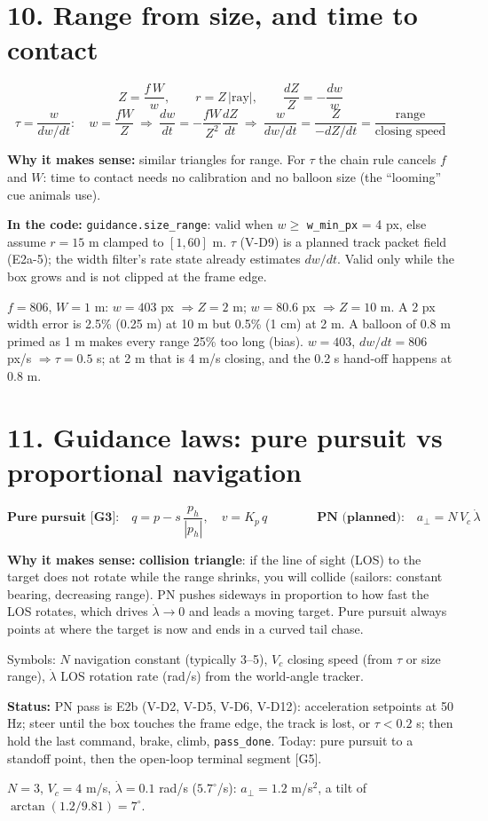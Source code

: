 \documentclass[10pt]{article}
\newcommand{\code}[1]{\textcolor{code}{\texttt{#1}}}
\newcommand{\where}[1]{\par\textbf{\textcolor{code}{In the code:}} #1}
\newcommand{\why}[1]{\par\textbf{\textcolor{idea}{Why it makes sense:}} #1}
\newcommand{\status}[1]{\par\textbf{\textcolor{warn}{Status:}} #1}
\begin{document}
\section*{10. Range from size, and time to contact}
\begin{eqbox}
\[
Z = \frac{f\,W}{w},\qquad r = Z\,|\text{ray}|,\qquad
\frac{dZ}{Z} = -\frac{dw}{w}
\]
\[
\tau = \frac{w}{dw/dt}:\quad w = \frac{fW}{Z}\ \Rightarrow\ \frac{dw}{dt} = -\frac{fW}{Z^2}\frac{dZ}{dt}
\ \Rightarrow\ \frac{w}{dw/dt} = \frac{Z}{-dZ/dt} = \frac{\text{range}}{\text{closing speed}}
\]
\end{eqbox}
\why{similar triangles for range. For $\tau$ the chain rule cancels $f$ and $W$: time to
contact needs no calibration and no balloon size (the ``looming'' cue animals use).}
\where{\code{guidance.size\_range}: valid when $w \ge$ \code{w\_min\_px} = 4 px, else
assume $r = 15$ m clamped to $[1, 60]$ m. $\tau$ (V-D9) is a planned track packet field
(E2a-5); the width filter's rate state already estimates $dw/dt$. Valid only while the box
grows and is not clipped at the frame edge.}
\begin{exbox}
$f = 806$, $W = 1$ m: $w = 403$ px $\Rightarrow Z = 2$ m; $w = 80.6$ px $\Rightarrow
Z = 10$ m. A 2 px width error is 2.5\% (0.25 m) at 10 m but 0.5\% (1 cm) at 2 m. A balloon
of 0.8 m primed as 1 m makes every range 25\% too long (bias).
$w = 403$, $dw/dt = 806$ px/s $\Rightarrow \tau = 0.5$ s; at 2 m that is 4 m/s closing,
and the 0.2 s hand-off happens at 0.8 m.
\end{exbox}

\section*{11. Guidance laws: pure pursuit vs proportional navigation}
\begin{eqbox}
\[
\textbf{Pure pursuit [G3]:}\quad q = p - s\,\frac{p_h}{|p_h|},\quad v = K_p\,q
\qquad\qquad
\textbf{PN (planned):}\quad a_\perp = N\,V_c\,\dot\lambda
\]
\end{eqbox}
\why{\textbf{collision triangle}: if the line of sight (LOS) to the target does not
rotate while the range shrinks, you will collide (sailors: constant bearing, decreasing
range). PN pushes sideways in proportion to how fast the LOS rotates, which drives
$\dot\lambda \to 0$ and leads a moving target. Pure pursuit always points at where the
target is now and ends in a curved tail chase.}

Symbols: $N$ navigation constant (typically 3--5), $V_c$ closing speed (from $\tau$ or
size range), $\dot\lambda$ LOS rotation rate (rad/s) from the world-angle tracker.
\status{PN pass is E2b (V-D2, V-D5, V-D6, V-D12): acceleration setpoints at 50 Hz; steer
until the box touches the frame edge, the track is lost, or $\tau < 0.2$ s; then hold the
last command, brake, climb, \code{pass\_done}. Today: pure pursuit to a standoff point,
then the open-loop terminal segment [G5].}
\begin{exbox}
$N = 3$, $V_c = 4$ m/s, $\dot\lambda = 0.1$ rad/s ($5.7^\circ$/s): $a_\perp = 1.2$
m/s$^2$, a tilt of $\arctan(1.2/9.81) = 7^\circ$.
\end{exbox}
\end{document}
